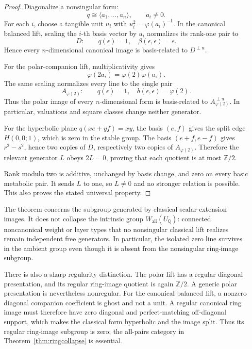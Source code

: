 \documentclass[11pt]{article}
\theoremstyle{definition}
\theoremstyle{remark}
\newcommand{\Integers}{\mathbb Z}
\newcommand{\Rationals}{\mathbb Q}
\begin{document}
\begin{proof}
Diagonalize a nonsingular form:
\[
 q\cong\langle a_1,\ldots,a_n\rangle,
 \qquad a_i\ne0.
\]
For each \(i\), choose a tangible unit \(u_i\) with
\(u_i^2=\varphi(a_i)^{-1}\).  In the canonical balanced lift, scaling the
\(i\)-th basis vector by \(u_i\) normalizes its rank-one pair to
\[
 D:\qquad q(\epsilon)=1,\quad \beta(\epsilon,\epsilon)=e.
\]
Hence every \(n\)-dimensional canonical image is basis-related to
\(D^{\perp n}\).

For the polar-companion lift, multiplicativity gives
\[
 \varphi(2a_i)=\varphi(2)\varphi(a_i).
\]
The same scaling normalizes every line to the single pair
\[
 A_{\varphi(2)}:\qquad
 q(\epsilon)=1,\quad b(\epsilon,\epsilon)=\varphi(2).
\]
Thus the polar image of every \(n\)-dimensional form is basis-related to
\(A_{\varphi(2)}^{\perp n}\).  In particular, valuations and square classes
change neither generator.

For the hyperbolic plane \(q(xe+yf)=xy\), the basis \((e,f)\) gives the split
edge \(H(0,0;1)\), which is zero in the stable group.  The basis
\((e+f,e-f)\) gives \(r^2-s^2\), hence two copies of \(D\), respectively two
copies of \(A_{\varphi(2)}\).  Therefore the relevant generator \(L\) obeys
\(2L=0\), proving that each quotient is at most \(\Integers/2\).

Rank modulo two is additive, unchanged by basis change, and zero on every
basic metabolic pair.  It sends \(L\) to one, so \(L\ne0\) and no stronger
relation is possible.  This also proves the stated universal property.
\end{proof}

The theorem concerns the subgroup generated by classical scalar-extension
images.  It does not collapse the intrinsic group
\(W_{\mathrm{all}}(U_{\Rationals})\): connected noncanonical weight or layer
types that no nonsingular classical lift realizes remain independent free
generators.  In particular, the isolated zero line survives in the ambient
group even though it is absent from the nonsingular ring-image subgroup.

There is also a sharp regularity distinction.  The polar lift has a regular
diagonal presentation, and its regular ring-image quotient is again
\(\Integers/2\).  A generic polar presentation is nevertheless nonregular.
For the canonical balanced lift, a nonzero diagonal companion coefficient is
ghost and not a unit.  A regular canonical ring image must therefore have
zero diagonal and perfect-matching off-diagonal support, which makes the
classical form hyperbolic and the image split.  Thus its regular ring-image
subgroup is zero; the all-pairs category in
Theorem~\ref{thm:ringcollapse} is essential.
\end{document}
